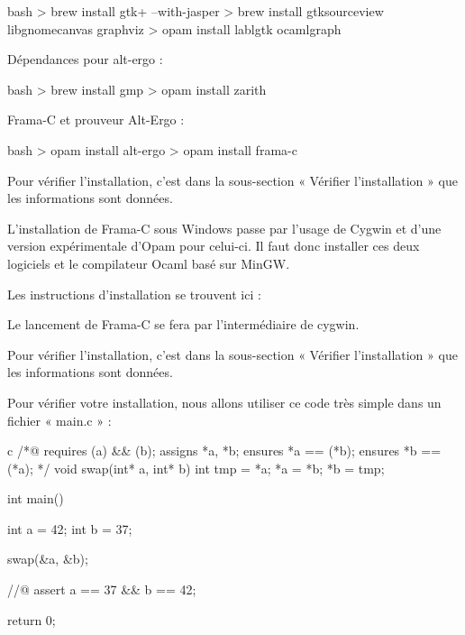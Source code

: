 \begin{CodeBlock}{bash}
> brew install gtk+ --with-jasper
> brew install gtksourceview libgnomecanvas graphviz
> opam install lablgtk ocamlgraph 
\end{CodeBlock}



Dépendances pour alt-ergo :



\begin{CodeBlock}{bash}
> brew install gmp
> opam install zarith
\end{CodeBlock}



Frama-C et prouveur Alt-Ergo :



\begin{CodeBlock}{bash}
> opam install alt-ergo
> opam install frama-c
\end{CodeBlock}



Pour vérifier l'installation, c'est dans la sous-section « Vérifier l'installation »
que les informations sont données.





L'installation de Frama-C sous Windows passe par l'usage de Cygwin et d'une
version expérimentale d'Opam pour celui-ci. Il faut donc installer ces deux
logiciels et le compilateur Ocaml basé sur MinGW.



Les instructions d'installation se trouvent ici :






Le lancement de Frama-C se fera par l'intermédiaire de cygwin.



Pour vérifier l'installation, c'est dans la sous-section « Vérifier l'installation »
que les informations sont données.





Pour vérifier votre installation, nous allons utiliser ce code très simple dans un 
fichier « main.c » :



\begin{CodeBlock}{c}
/*@
  requires \valid(a) && \valid(b);
  assigns *a, *b;
  ensures *a == \old(*b);
  ensures *b == \old(*a);
*/
void swap(int* a, int* b){
  int tmp = *a;
  *a = *b;
  *b = tmp;
}

int main(){
  int a = 42;
  int b = 37;

  swap(&a, &b);

  //@ assert a == 37 && b == 42;

  return 0;
}
\end{CodeBlock}



